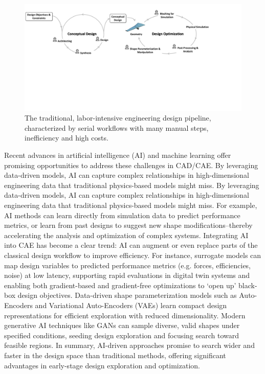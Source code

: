 \begin{figure}[tbh]
    \begin{center}
        \includegraphics[width=1\linewidth]{chapter1/fig/traditional_framework.pdf}
    \end{center}
    \vspace{-3mm}
    \caption{
        \small The traditional, labor-intensive engineering design pipeline, characterized by serial workflows with many manual steps, inefficiency and high costs.
    }
    \label{ch1:fig:traditional_framework}
\end{figure}

Recent advances in artificial intelligence (AI) and machine learning offer promising opportunities to address these challenges in CAD/CAE. By leveraging data-driven models, AI can capture complex relationships in high-dimensional engineering data that traditional physics-based models might miss. By leveraging data-driven models, AI can capture complex relationships in high-dimensional engineering data that traditional physics-based models might miss. For example, AI methods can learn directly from simulation data to predict performance metrics, or learn from past designs to suggest new shape modifications--thereby accelerating the analysis and optimization of complex systems. Integrating AI into CAE has become a clear trend: AI can augment or even replace parts of the classical design workflow to improve efficiency. For instance, surrogate models can map design variables to predicted performance metrics (e.g. forces, efficiencies, noise) at low latency, supporting rapid evaluations in digital twin systems and enabling both gradient-based and gradient-free optimizations to `open up' black-box design objectives. Data-driven shape parameterization models such as Auto-Encoders and Variational Auto-Encoders (VAEs) learn compact design representations for efficient exploration with reduced dimensionality. Modern generative AI techniques like GANs can sample diverse, valid shapes under specified conditions, seeding design exploration and focusing search toward feasible regions. In summary, AI-driven approaches promise to search wider and faster in the design space than traditional methods, offering significant advantages in early-stage design exploration and optimization.

